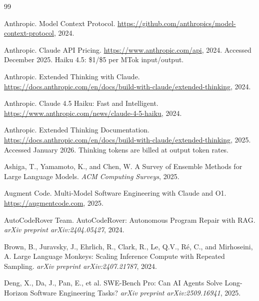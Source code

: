 \documentclass[11pt,a4paper]{article}
\begin{document}
\begin{thebibliography}{99}

Anthropic.
\newblock Model Context Protocol.
\newblock \url{https://github.com/anthropics/model-context-protocol}, 2024.

Anthropic.
\newblock Claude API Pricing.
\newblock \url{https://www.anthropic.com/api}, 2024.
\newblock Accessed December 2025. Haiku 4.5: \$1/\$5 per MTok input/output.

Anthropic.
\newblock Extended Thinking with Claude.
\newblock \url{https://docs.anthropic.com/en/docs/build-with-claude/extended-thinking}, 2024.

Anthropic.
\newblock Claude 4.5 Haiku: Fast and Intelligent.
\newblock \url{https://www.anthropic.com/news/claude-4-5-haiku}, 2024.

Anthropic.
\newblock Extended Thinking Documentation.
\newblock \url{https://docs.anthropic.com/en/docs/build-with-claude/extended-thinking}, 2025.
\newblock Accessed January 2026. Thinking tokens are billed at output token rates.

Ashiga, T., Yamamoto, K., and Chen, W.
\newblock A Survey of Ensemble Methods for Large Language Models.
\newblock \emph{ACM Computing Surveys}, 2025.

Augment Code.
\newblock Multi-Model Software Engineering with Claude and O1.
\newblock \url{https://augmentcode.com}, 2025.

AutoCodeRover Team.
\newblock AutoCodeRover: Autonomous Program Repair with RAG.
\newblock \emph{arXiv preprint arXiv:2404.05427}, 2024.

Brown, B., Juravsky, J., Ehrlich, R., Clark, R., Le, Q.V., Ré, C., and Mirhoseini, A.
\newblock Large Language Monkeys: Scaling Inference Compute with Repeated Sampling.
\newblock \emph{arXiv preprint arXiv:2407.21787}, 2024.

Deng, X., Da, J., Pan, E., et al.
\newblock SWE-Bench Pro: Can AI Agents Solve Long-Horizon Software Engineering Tasks?
\newblock \emph{arXiv preprint arXiv:2509.16941}, 2025.


\end{thebibliography}
\end{document}
